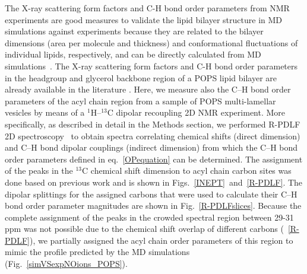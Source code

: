 \documentclass[journal=jpcbfk,manuscript=article]{achemso}
\begin{document}
The X-ray scattering form factors and C-H bond order parameters from NMR experiments are good measures to validate
the lipid bilayer structure in MD simulations against experiments because they
are related to the bilayer dimensions (area per molecule and thickness) and
conformational fluctuations of individual lipids, respectively, and 
can be directly calculated from MD simulations~\cite{ollila16}.
The X-ray scattering form factors and C-H bond order parameters in
the headgroup and glycerol backbone region of a POPS lipid bilayer are already available in the literature \cite{kucerka14,NMRlipidsIV}.
Here, we measure also the C--H bond order parameters of the acyl chain region from a sample of POPS multi-lamellar vesicles by means of a $^1$H--$^{13}$C dipolar recoupling 2D NMR experiment. More specifically, as described in detail in the Methods section, we performed R-PDLF 2D spectroscopy~\cite{dvinskikh04} to obtain spectra correlating chemical shifts (direct dimension) and C--H bond dipolar couplings (indirect dimension) from which the C--H bond order parameters defined in eq.~\ref{OPequation} can be determined. The assignment of the peaks in the $^{13}$C chemical shift dimension to acyl chain carbon sites was done based on previous work {\cite{ferreira13}} and is shown in Figs.~\ref{INEPT}~and~\ref{R-PDLF}. The dipolar splittings for the assigned carbons that were used to calculate their C--H bond order parameter magnitudes are shown in Fig.~\ref{R-PDLFslices}. Because the complete assignment of the peaks in the crowded spectral region between 29-31 ppm was not possible due to the chemical shift overlap of different carbons (~\ref{R-PDLF}), we partially assigned the acyl chain order parameters of this region to mimic the profile predicted by the MD simulations (Fig.~\ref{simVSexpNOions_POPS}).
\end{document}
